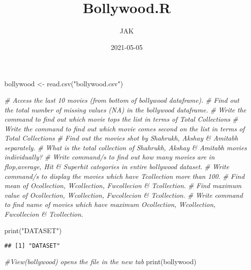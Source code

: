 \documentclass[
]{article}
\title{Bollywood.R}
\author{JAK}
\date{2021-05-05}
\newenvironment{Shaded}{\begin{snugshade}}{\end{snugshade}}
\newcommand{\CommentTok}[1]{\textcolor[rgb]{0.56,0.35,0.01}{\textit{#1}}}
\newcommand{\FunctionTok}[1]{\textcolor[rgb]{0.00,0.00,0.00}{#1}}
\newcommand{\NormalTok}[1]{#1}
\newcommand{\OtherTok}[1]{\textcolor[rgb]{0.56,0.35,0.01}{#1}}
\newcommand{\StringTok}[1]{\textcolor[rgb]{0.31,0.60,0.02}{#1}}
\begin{document}
\maketitle

\begin{Shaded}
\begin{Highlighting}[]
\NormalTok{bollywood }\OtherTok{\textless{}{-}} \FunctionTok{read.csv}\NormalTok{(}\StringTok{"bollywood.csv"}\NormalTok{)}

\CommentTok{\# Access the last 10 movies (from bottom of bollywood dataframe).}
\CommentTok{\# Find out the total number of missing values (NA) in the bollywood dataframe.}
\CommentTok{\# Write the command to find out which movie tops the list in terms of Total Collections}
\CommentTok{\# Write the command to find out which movie comes second on the list in terms of Total Collections}
\CommentTok{\# Find out the movies shot by Shahrukh, Akshay \& Amitabh separately.}
\CommentTok{\# What is the total collection of Shahrukh, Akshay \& Amitabh movies individually?}
\CommentTok{\#     Write command/s to find out how many movies are in flop,average, Hit \& Superhit categories in entire bollywood dataset.}
\CommentTok{\# Write command/s to display the movies which have Tcollection more than 100.}
\CommentTok{\# Find mean of Ocollection, Wcollection, Fwcollecion \& Tcollection.}
\CommentTok{\# Find maximum value of Ocollection, Wcollection, Fwcollecion \& Tcollection.}
\CommentTok{\# Write command to find name of movies which have maximum Ocollection, Wcollection, Fwcollecion \& Tcollection.}


\FunctionTok{print}\NormalTok{(}\StringTok{"DATASET"}\NormalTok{)}
\end{Highlighting}
\end{Shaded}

\begin{verbatim}
## [1] "DATASET"
\end{verbatim}

\begin{Shaded}
\begin{Highlighting}[]
\CommentTok{\#View(bollywood) opens the file in the new tab}
\FunctionTok{print}\NormalTok{(bollywood)}
\end{Highlighting}
\end{Shaded}
\end{document}
